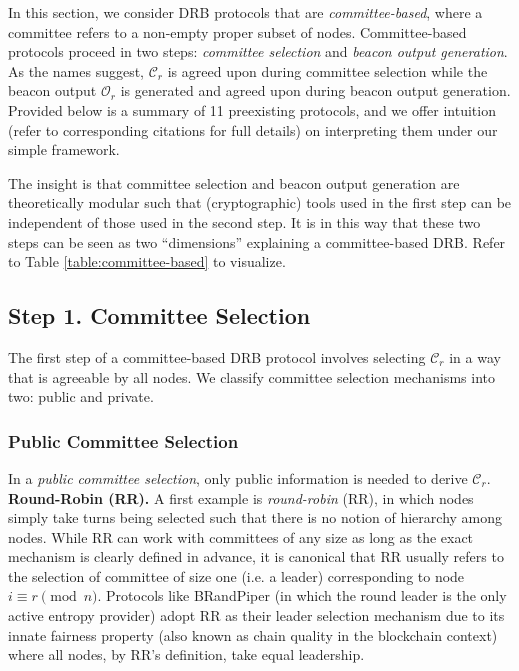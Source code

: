 \documentclass[letterpaper,twocolumn,10pt]{article}
\theoremstyle{definition}
\theoremstyle{remark}
\begin{document}
In this section, we consider DRB protocols that are \textit{committee-based}, where a committee refers to a non-empty proper subset of nodes. Committee-based protocols proceed in two steps: \textit{committee selection} and \textit{beacon output generation}. As the names suggest, $\mathcal{C}_r$ is agreed upon during committee selection while the beacon output $\mathcal{O}_r$ is generated and agreed upon during beacon output generation. Provided below is a summary of 11 preexisting protocols, and we offer intuition (refer to corresponding citations for full details) on interpreting them under our simple framework.

The insight is that committee selection and beacon output generation are theoretically modular such that (cryptographic) tools used in the first step can be independent of those used in the second step. It is in this way that these two steps can be seen as two ``dimensions'' explaining a committee-based DRB. Refer to Table \ref{table:committee-based} to visualize.

\subsection{Step 1. Committee Selection}
The first step of a committee-based DRB protocol involves selecting $\mathcal{C}_r$ in a way that is agreeable by all nodes. We classify committee selection mechanisms into two: public and private.

\subsubsection{Public Committee Selection}
\label{subsubsection:public-committee-selection}
In a \textit{public committee selection}, only public information is needed to derive $\mathcal{C}_r$.\\

\noindent\textbf{Round-Robin (RR).} A first example is \textit{round-robin} (RR), in which nodes simply take turns being selected such that there is no notion of hierarchy among nodes. While RR can work with committees of any size as long as the exact mechanism is clearly defined in advance, it is canonical that RR usually refers to the selection of committee of size one (i.e. a leader) corresponding to node $i \equiv r \pmod n$. Protocols like BRandPiper \cite{bhat2020randpiper} (in which the round leader is the only active entropy provider) adopt RR as their leader selection mechanism due to its innate fairness property \cite{azouvi2018winning} (also known as chain quality \cite{garay2015bitcoin} in the blockchain context) where all nodes, by RR's definition, take equal leadership.\\
\end{document}
